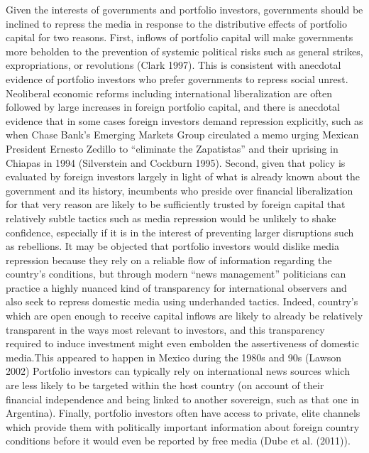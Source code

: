 \documentclass[a4paper]{article}\usepackage[]{graphicx}\usepackage[]{color}
\begin{document}
Given the interests of governments and portfolio investors, governments should be inclined to repress the media in response to the distributive effects of portfolio capital for two reasons. First, inflows of portfolio capital will make governments more beholden to the prevention of systemic political risks such as general strikes, expropriations, or revolutions (Clark 1997). This is consistent with anecdotal evidence of portfolio investors who prefer governments to repress social unrest. Neoliberal economic reforms including international liberalization are often followed by large increases in foreign portfolio capital, and there is anecdotal evidence that in some cases foreign investors demand repression explicitly, such as when Chase Bank's Emerging Markets Group circulated a memo urging Mexican President Ernesto Zedillo to “eliminate the Zapatistas” and their uprising in Chiapas in 1994 (Silverstein and Cockburn 1995). Second, given that policy is evaluated by foreign investors largely in light of what is already known about the government and its history, incumbents who preside over financial liberalization for that very reason are likely to be sufficiently trusted by foreign capital that relatively subtle tactics such as media repression would be unlikely to shake confidence, especially if it is in the interest of preventing larger disruptions such as rebellions. It may be objected that portfolio investors would dislike media repression because they rely on a reliable flow of information regarding the country's conditions, but through modern “news management” politicians can practice a highly nuanced kind of transparency for international observers and also seek to repress domestic media using underhanded tactics. Indeed, country's which are open enough to receive capital inflows are likely to already be relatively transparent in the ways most relevant to investors, and this transparency required to induce investment might even embolden the assertiveness of domestic media.This appeared to happen in Mexico during the 1980s and 90s (Lawson 2002) Portfolio investors can typically rely on international news sources which are less likely to be targeted within the host country (on account of their financial independence and being linked to another sovereign, such as that one in Argentina). Finally, portfolio investors often have access to private, elite channels which provide them with politically important information about foreign country conditions before it would even be reported by free media (Dube et al. (2011)).
\end{document}

